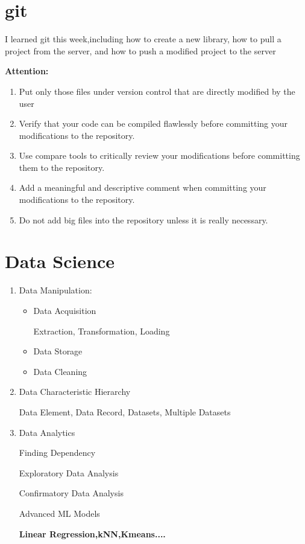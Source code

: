 \section{git}\label{sec-git}
I learned git this week,including how to create a new library, how to pull a project from the server, and how to push a modified project to the server

\textbf{Attention:}
\begin{enumerate}
  \item Put only those files under version control that are directly modified by the user
  \item Verify that your code can be compiled flawlessly before committing your modifications to the repository.
  \item Use compare tools to critically review your modifications before committing them to the repository.
  \item Add a meaningful and descriptive comment when committing your modifications to the repository.
  \item Do not add big files into the repository unless it is really necessary.
\end{enumerate}


\section{Data Science} \label{sec-Data_Science}
\begin{enumerate}
  \item Data Manipulation:
    \begin{itemize}
      \item Data Acquisition\par
        Extraction,
        Transformation,
        Loading
      \item Data Storage
      \item Data Cleaning
    \end{itemize}
  \item Data Characteristic Hierarchy\par
    Data Element,
    Data Record,
    Datasets,%
    Multiple Datasets  
  \item Data Analytics\par
    Finding Dependency\par
    Exploratory Data Analysis\par
    Confirmatory Data Analysis\par
    Advanced ML Models\par
    \hspace{2em}\textbf{Linear Regression,kNN,Kmeans....}
\end{enumerate}



